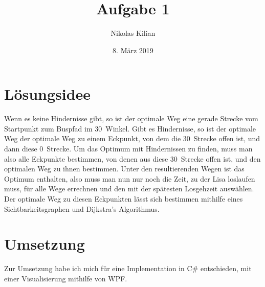\documentclass[12pt]{article}
\title{\vspace{-2.0cm}Aufgabe 1}
\author{Nikolas Kilian}
\date{8. März 2019}
\begin{document}
\maketitle

\section{Lösungsidee}
Wenn es keine Hindernisse gibt, so ist der optimale Weg eine gerade Strecke vom Startpunkt zum Buspfad im 30\degree\ Winkel.
Gibt es Hindernisse, so ist der optimale Weg der optimale Weg zu einem Eckpunkt, von dem die 30\degree\ Strecke offen ist, und dann diese 0\degree\ Strecke.
Um das Optimum mit Hindernissen zu finden, muss man also alle Eckpunkte bestimmen, von denen aus diese 30\degree\ Strecke offen ist, und den optimalen Weg zu ihnen bestimmen. Unter den resultierenden Wegen ist das Optimum enthalten, also muss man nun nur noch die Zeit, zu der Lisa loslaufen muss, für alle Wege errechnen und den mit der spätesten Losgehzeit auswählen.
Der optimale Weg zu diesen Eckpunkten lässt sich bestimmen mithilfe eines Sichtbarkeitsgraphen und Dijkstra's Algorithmus.

\section{Umsetzung}
Zur Umsetzung habe ich mich für eine Implementation in C\# entschieden, mit einer Visualisierung mithilfe von WPF.
\end{document}
